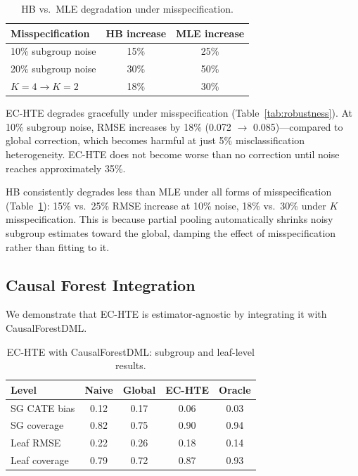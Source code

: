 \documentclass[11pt,a4paper]{article}
\begin{document}
\begin{table}[t]
\centering
\small
\caption{HB vs.\ MLE degradation under misspecification.}
\label{tab:robustness_hb_mle}
\begin{tabular}{lcc}
\toprule
Misspecification & HB increase & MLE increase \\
\midrule
10\% subgroup noise & 15\% & 25\% \\
20\% subgroup noise & 30\% & 50\% \\
$K\!=\!4 \to K\!=\!2$ & 18\% & 30\% \\
\bottomrule
\end{tabular}
\end{table}

EC-HTE degrades gracefully under misspecification (Table~\ref{tab:robustness}).
At 10\% subgroup noise, RMSE increases by 18\% (0.072 $\to$ 0.085)---compared to global correction, which becomes harmful at just 5\% misclassification heterogeneity.
EC-HTE does not become worse than no correction until noise reaches approximately 35\%.

HB consistently degrades less than MLE under all forms of misspecification (Table~\ref{tab:robustness_hb_mle}): 15\% vs.\ 25\% RMSE increase at 10\% noise, 18\% vs.\ 30\% under $K$ misspecification.
This is because partial pooling automatically shrinks noisy subgroup estimates toward the global, damping the effect of misspecification rather than fitting to it.

\subsection{Causal Forest Integration}
\label{sec:cf}

We demonstrate that EC-HTE is estimator-agnostic by integrating it with CausalForestDML.

\begin{table}[t]
\centering
\small
\caption{EC-HTE with CausalForestDML: subgroup and leaf-level results.}
\label{tab:cf}
\begin{tabular}{lcccc}
\toprule
Level & Naive & Global & EC-HTE & Oracle \\
\midrule
SG CATE bias & 0.12 & 0.17 & 0.06 & 0.03 \\
SG coverage & 0.82 & 0.75 & 0.90 & 0.94 \\
Leaf RMSE & 0.22 & 0.26 & 0.18 & 0.14 \\
Leaf coverage & 0.79 & 0.72 & 0.87 & 0.93 \\
\bottomrule
\end{tabular}
\end{table}
\end{document}
